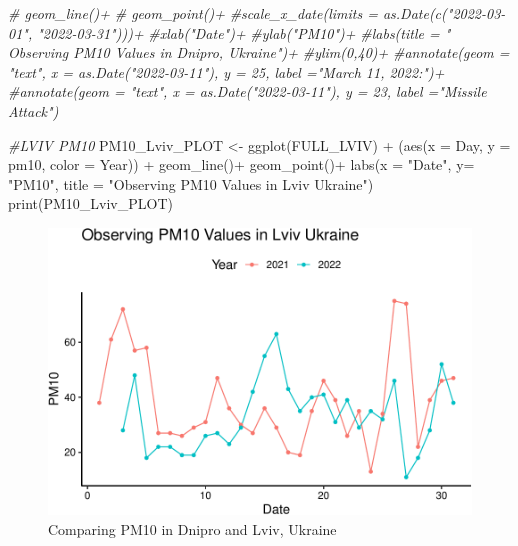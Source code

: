 \documentclass[
  12pt,
]{article}
\newenvironment{Shaded}{\begin{snugshade}}{\end{snugshade}}
\newcommand{\AttributeTok}[1]{\textcolor[rgb]{0.77,0.63,0.00}{#1}}
\newcommand{\CommentTok}[1]{\textcolor[rgb]{0.56,0.35,0.01}{\textit{#1}}}
\newcommand{\FunctionTok}[1]{\textcolor[rgb]{0.00,0.00,0.00}{#1}}
\newcommand{\NormalTok}[1]{#1}
\newcommand{\OtherTok}[1]{\textcolor[rgb]{0.56,0.35,0.01}{#1}}
\newcommand{\SpecialCharTok}[1]{\textcolor[rgb]{0.00,0.00,0.00}{#1}}
\newcommand{\StringTok}[1]{\textcolor[rgb]{0.31,0.60,0.02}{#1}}
\begin{document}
\begin{Shaded}
\begin{Highlighting}[]
            \CommentTok{\#  geom\_line()+  }
 \CommentTok{\# geom\_point()+}
  \CommentTok{\#scale\_x\_date(limits = as.Date(c("2022{-}03{-}01", "2022{-}03{-}31")))+ }
  \CommentTok{\#xlab("Date")+ }
  \CommentTok{\#ylab("PM10")+ }
  \CommentTok{\#labs(title = "        Observing PM10 Values in Dnipro, Ukraine")+}
  \CommentTok{\#ylim(0,40)+}
  \CommentTok{\#annotate(geom = "text", x = as.Date("2022{-}03{-}11"), y = 25, label ="March 11, 2022:")+ }
  \CommentTok{\#annotate(geom = "text", x = as.Date("2022{-}03{-}11"), y = 23, label ="Missile Attack")}
  


\CommentTok{\#LVIV PM10}
\NormalTok{PM10\_Lviv\_PLOT }\OtherTok{\textless{}{-}}
  \FunctionTok{ggplot}\NormalTok{(FULL\_LVIV) }\SpecialCharTok{+} 
\NormalTok{(}\FunctionTok{aes}\NormalTok{(}\AttributeTok{x =}\NormalTok{ Day, }\AttributeTok{y =}\NormalTok{ pm10, }\AttributeTok{color =}\NormalTok{ Year)) }\SpecialCharTok{+} 
              \FunctionTok{geom\_line}\NormalTok{()}\SpecialCharTok{+}  
  \FunctionTok{geom\_point}\NormalTok{()}\SpecialCharTok{+}
  \FunctionTok{labs}\NormalTok{(}\AttributeTok{x =} \StringTok{"Date"}\NormalTok{, }\AttributeTok{y=} \StringTok{"PM10"}\NormalTok{,}
       \AttributeTok{title =} \StringTok{"Observing PM10 Values in Lviv Ukraine"}\NormalTok{)  }
\FunctionTok{print}\NormalTok{(PM10\_Lviv\_PLOT)}
\end{Highlighting}
\end{Shaded}

\begin{figure}
\centering
\includegraphics{Fontanie_Gordon_Weinberg_Project_files/figure-latex/Plotting PM10-2.pdf}
\caption{Comparing PM10 in Dnipro and Lviv, Ukraine}
\end{figure}
\end{document}

